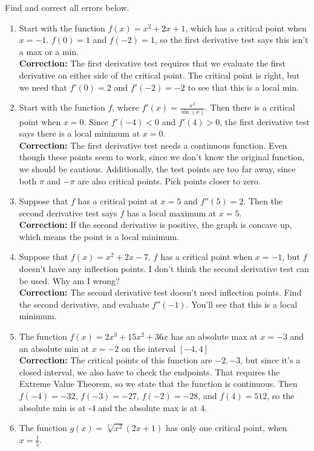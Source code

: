 \documentclass{article}
\begin{document}
Find and correct all errors below.
\begin{enumerate}
\item Start with the function $f(x) = x^2 + 2x + 1$, which has a critical point when $x = -1$. $f(0) = 1$ and $f(-2) = 1$, so the first derivative test says this isn't a max or a min.
\\ \textbf{Correction:} The first derivative test requires that we evaluate the first derivative on either side of the critical point. The critical point is right, but we need that $f'(0) = 2$ and $f'(-2) = -2$ to see that this is a local min.
\item Start with the function $f$, where $f'(x) = \frac{x^2}{\sin(x)}$. Then there is a critical point when $x=0$. Since $f'(-4)<0$ and $f'(4) > 0$, the first derivative test says there is a local minimum at $x=0$.
\\ \textbf{Correction:} The first derivative test needs a continuous function. Even though these points seem to work, since we don't know the original function, we should be cautious. Additionally, the test points are too far away, since both $\pi$ and $-\pi$ are also critical points. Pick points closer to zero.
\item Suppose that $f$ has a critical point at $x = 5$ and $f''(5) = 2$. Then the second derivative test says $f$ has a local maximum at $x=5$.
\\ \textbf{Correction:} If the second derivative is positive, the graph is concave up, which means the point is a local minimum.
\item Suppose that $f(x) = x^2 + 2x -7$. $f$ has a critical point when $x = -1$, but $f$ doesn't have any inflection points. I don't think the second derivative test can be used. Why am I wrong?
\\ \textbf{Correction:} The second derivative test doesn't need inflection points. Find the second derivative, and evaluate $f''(-1)$. You'll see that this is a local minimum.
\item The function $f(x) = 2x^3 + 15x^2 + 36x$ has an absolute max at $x=-3$ and an absolute min at $x = -2$ on the interval $[-4,4]$
\\ \textbf{Correction:} The critical points of this function are $-2,-3$, but since it's a closed interval, we also have to check the endpoints. That requires the Extreme Value Theorem, so we state that the function is continuous. Then $f(-4) = -32$, $f(-3) = -27$, $f(-2) = -28$, and $f(4) = 512$, so the absolute min is at -4 and the absolute max is at 4.
\item The function $g(x) = \sqrt[3]{x^2}(2x+1)$ has only one critical point, when $x=\frac{1}{5}$.

\end{enumerate}
\end{document}

